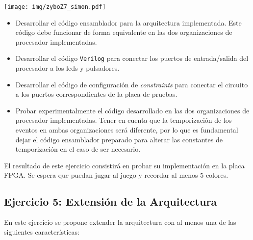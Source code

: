 \documentclass[a4paper,11pt]{article}
\begin{document}
\begin{center}
 
\texttt{[image: img/zyboZ7\_simon.pdf]}
\end{center}

\begin{itemize}
 \item Desarrollar el código ensamblador para la arquitectura implementada. Este código debe funcionar de forma equivalente en las dos organizaciones de procesador implementadas.

 \item Desarrollar el código \texttt{Verilog} para conectar los puertos de entrada/salida del procesador a los leds y pulsadores.
 
 \item Desarrollar el código de configuración de \emph{constraints} para conectar el circuito a los puertos correspondientes de la placa de pruebas.
 
 \item Probar experimentalmente el código desarrollado en las dos organizaciones de procesador implementadas. Tener en cuenta que la temporización de los eventos en ambas organizaciones será diferente, por lo que es fundamental dejar el código ensamblador preparado para alterar las constantes de temporización en el caso de ser necesario.
\end{itemize}

El resultado de este ejercicio consistirá en probar su implementación en la placa FPGA. Se espera que puedan jugar al juego y recordar al menos 5 colores.

\subsection{Ejercicio 5: Extensión de la Arquitectura}

En este ejercicio se propone extender la arquitectura con al menos una de las siguientes características:
\end{document}
